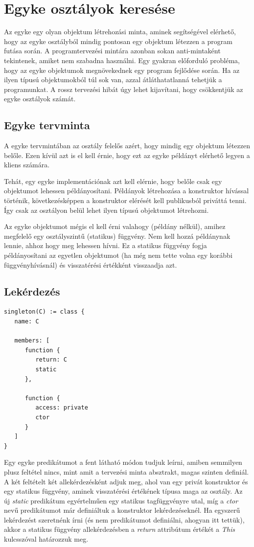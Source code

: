 \documentclass[a4paper,12pt]{report}
\begin{document}
\section{Egyke osztályok keresése}
Az egyke egy olyan objektum létrehozási minta, aminek segítségével elérhető, hogy az egyke osztályból mindig pontosan egy objektum létezzen a program futása során. A programtervezési mintára azonban sokan anti-mintaként tekintenek, amiket nem szabadna használni. Egy gyakran előforduló probléma, hogy az egyke objektumok megnövekednek egy program fejlődése során. Ha az ilyen típusú objektumokból túl sok van, azzal átláthatatlanná tehetjük a programunkat. A rossz tervezési hibát úgy lehet kijavítani, hogy csökkentjük az egyke osztályok számát.
\subsection{Egyke tervminta}
A egyke tervmintában az osztály felelős azért, hogy mindig egy objektum létezzen belőle. Ezen kívül azt is el kell érnie, hogy ezt az egyke példányt elérhető legyen a kliens számára.
\par Tehát, egy egyke implementációnak azt kell elérnie, hogy belőle csak egy objektumot lehessen példányosítani. Példányok létrehozása a konstruktor hívással történik, következésképpen a konstruktor elérését kell publikusból priváttá tenni. Így csak az osztályon belül lehet ilyen típusú objektumot létrehozni.
\par Az egyke objektumot mégis el kell érni valahogy (példány nélkül), amihez megfelelő egy osztályszintű (statikus) függvény. Nem kell hozzá példánynak lennie, ahhoz hogy meg lehessen hívni. Ez a statikus függvény fogja példányosítani az egyetlen objektumot (ha még nem tette volna egy korábbi függvényhívásnál) és visszatérési értékként visszaadja azt.
\subsection{Lekérdezés}
\begin{verbatim}
singleton(C) := class {
   name: C

   members: [ 
      function {
         return: C
         static
      },

      function {
         access: private 
         ctor      
      }
   ]
}
\end{verbatim}
\par Egy egyke predikátumot a fent látható módon tudjuk leírni, amiben semmilyen plusz feltétel nincs, mint amit a tervezési minta absztrakt, magas szinten definiál. A két feltételt két allekérdezésként adjuk meg, ahol van egy privát konstruktor és egy statikus függvény, aminek visszatérési értékének típusa maga az osztály. Az új \textit{static} predikátum egyértelműen egy statikus tagfüggvényre utal, míg a \textit{ctor} nevű predikátumot már definiáltuk a konstruktor lekérdezéseknél. Ha egyszerű lekérdezést szeretnénk írni (és nem predikátumot definiálni, ahogyan itt tettük), akkor a statikus függvény allekérdezésben a \textit{return} attribútum értékét a \textit{This} kulcsszóval határozzuk meg.
\end{document}
